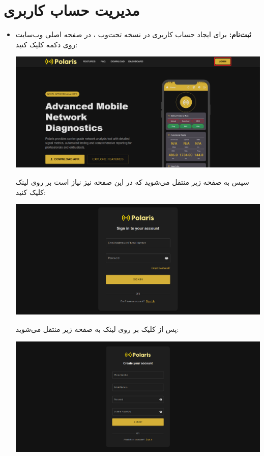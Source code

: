     \section{مدیریت حساب کاربری}
    \begin{itemize}
    	\item \textbf{ثبت‌نام:} برای ایجاد حساب کاربری در نسخه تحت‌وب ، در صفحه اصلی وب‌سایت روی دکمه  کلیک کنید:
	    	\begin{center}
	    		\includegraphics[width=\textwidth]{images/fr-landing.png}
	    	\end{center}
    	سپس به صفحه زیر منتقل می‌شوید که در این صفحه نیز نیاز است بر روی لینک  کلیک کنید:
    		\begin{center}
    			\includegraphics[width=\textwidth]{images/fr-login-empty.png}
    		\end{center} 
    		پس از کلیک بر روی لینک  به صفحه زیر منتقل می‌شوید:
    		\begin{center}
    			\includegraphics[width=\textwidth]{images/fr-signup-empty.png}

\end{center}
\end{itemize}
